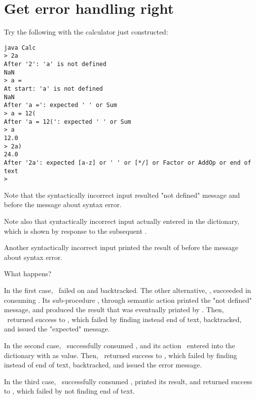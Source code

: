 
\section{Get error handling right\label{errors}}


Try the following with the calculator just constructed:

\small
\begin{Verbatim}[samepage=true,xleftmargin=15mm,baselinestretch=0.8]
java Calc
> 2a
After '2': 'a' is not defined
NaN
> a =
At start: 'a' is not defined
NaN
After 'a =': expected ' ' or Sum
> a = 12(
After 'a = 12(': expected ' ' or Sum
> a
12.0
> 2a)
24.0
After '2a': expected [a-z] or ' ' or [*/] or Factor or AddOp or end of text
>
\end{Verbatim}
\normalsize

Note that the syntactically incorrect input 
resulted "not defined" message and 
before the message about syntax error.

Note also that syntactically incorrect input 
actually entered  in the dictionary, which is shown 
by response to the subsequent .

Another syntactically incorrect input 
printed the result of 
before the message about syntax error.

What happens?

In the first case, \Store\ failed on  and backtracked.
The other alternative, \Print, succeeded in consuming .
Its sub-procedure \Factor, through semantic action 
printed the "not defined" message, and produced the result 
that was eventually printed by \Printa.
Then, \Print\ returned success to \Input, which failed
by finding  instead end of text, 
backtracked, and issued the "expected" message.

In the second case, \Store\ successfully consumed ,
and its action \Storea\ entered  into the dictionary with  as value.
Then, \Store\ returned success to \Input, which failed by finding  instead of end of text,
backtracked, and issued the error message.

In the third case, \Print\ successfully consumed , printed its result,
and returned success to \Input, which failed by not finding end of text.

